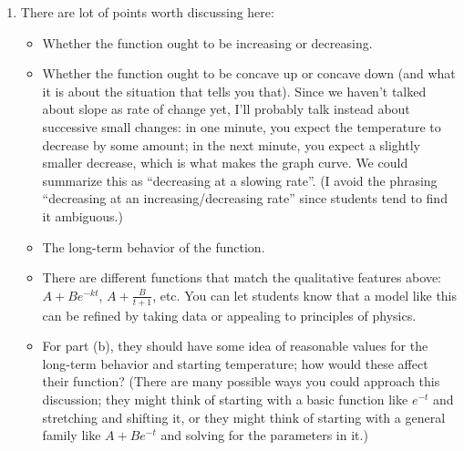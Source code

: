 \documentclass[10pt]{article}
\begin{document}
\begin{enumerate}[leftmargin=*]

\item
    \begin{note}
        There are lot of points worth discussing here:
        
        \begin{itemize}
            \item Whether the function ought to be increasing or decreasing.
            \item Whether the function ought to be concave up or concave down (and
            what it is about the situation that tells you that).  Since we
            haven't talked about slope as rate of change yet, I'll probably talk
            instead about successive small changes: in one minute, you expect
            the temperature to decrease by some amount; in the next minute, you
            expect a slightly smaller decrease, which is what makes the graph
            curve.  We could summarize this as ``decreasing at a slowing rate''.
            (I avoid the phrasing ``decreasing at an increasing/decreasing
            rate'' since students tend to find it ambiguous.)
            \item The long-term behavior of the function.
            \item There are different functions that match the qualitative
            features above: $A + B e^{-kt}$, $A + \frac{B}{t + 1}$, etc. You
            can let students know that a model like this can be refined by
            taking data or appealing to principles of physics.
            \item For part (b), they should
            have some idea of reasonable values for the long-term behavior and
            starting temperature; how would these affect their function?  (There
            are many possible ways you could approach this discussion; they
            might think of starting with a basic function like $e^{-t}$ and
            stretching and shifting it, or they might think of starting with a
            general family like $A + B e^{-t}$ and solving for the parameters in
            it.) 
        \end{itemize}
    \end{note}


\end{enumerate}
\end{document}
